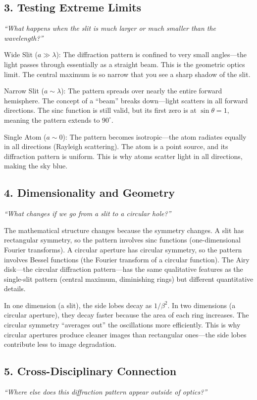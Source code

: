 \documentclass[11pt,openright]{book}
\begin{document}
\subsection*{3. Testing Extreme Limits}
\textit{``What happens when the slit is much larger or much smaller than the wavelength?''}

Wide Slit ($a \gg \lambda$): The diffraction pattern is confined to very small angles---the light passes through essentially as a straight beam. This is the geometric optics limit. The central maximum is so narrow that you see a sharp shadow of the slit.

Narrow Slit ($a \sim \lambda$): The pattern spreads over nearly the entire forward hemisphere. The concept of a ``beam'' breaks down---light scatters in all forward directions. The sinc function is still valid, but its first zero is at $\sin\theta = 1$, meaning the pattern extends to $90^\circ$.

Single Atom ($a \sim 0$): The pattern becomes isotropic---the atom radiates equally in all directions (Rayleigh scattering). The atom is a point source, and its diffraction pattern is uniform. This is why atoms scatter light in all directions, making the sky blue.

\subsection*{4. Dimensionality and Geometry}
\textit{``What changes if we go from a slit to a circular hole?''}

The mathematical structure changes because the symmetry changes. A slit has rectangular symmetry, so the pattern involves $\text{sinc}$ functions (one-dimensional Fourier transforms). A circular aperture has circular symmetry, so the pattern involves Bessel functions (the Fourier transform of a circular function). The Airy disk---the circular diffraction pattern---has the same qualitative features as the single-slit pattern (central maximum, diminishing rings) but different quantitative details.

In one dimension (a slit), the side lobes decay as $1/\beta^2$. In two dimensions (a circular aperture), they decay faster because the area of each ring increases. The circular symmetry ``averages out'' the oscillations more efficiently. This is why circular apertures produce cleaner images than rectangular ones---the side lobes contribute less to image degradation.

\subsection*{5. Cross-Disciplinary Connection}
\textit{``Where else does this diffraction pattern appear outside of optics?''}
\end{document}
